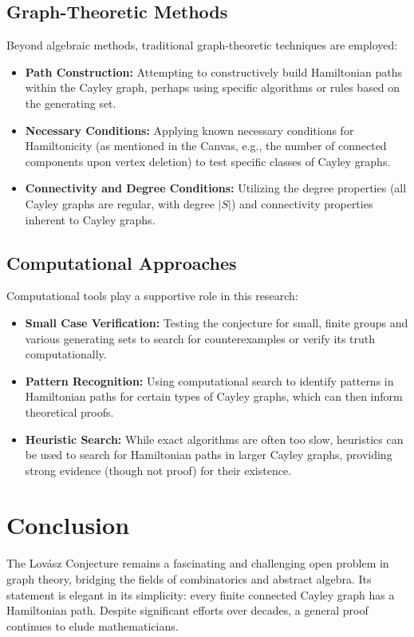 \documentclass[12pt]{article}
\theoremstyle{remark}
\begin{document}
\subsection{Graph-Theoretic Methods}
Beyond algebraic methods, traditional graph-theoretic techniques are employed:
\begin{itemize}
    \item \textbf{Path Construction:} Attempting to constructively build Hamiltonian paths within the Cayley graph, perhaps using specific algorithms or rules based on the generating set.
    \item \textbf{Necessary Conditions:} Applying known necessary conditions for Hamiltonicity (as mentioned in the Canvas, e.g., the number of connected components upon vertex deletion) to test specific classes of Cayley graphs.
    \item \textbf{Connectivity and Degree Conditions:} Utilizing the degree properties (all Cayley graphs are regular, with degree $|S|$) and connectivity properties inherent to Cayley graphs.
\end{itemize}

\subsection{Computational Approaches}
Computational tools play a supportive role in this research:
\begin{itemize}
    \item \textbf{Small Case Verification:} Testing the conjecture for small, finite groups and various generating sets to search for counterexamples or verify its truth computationally.
    \item \textbf{Pattern Recognition:} Using computational search to identify patterns in Hamiltonian paths for certain types of Cayley graphs, which can then inform theoretical proofs.
    \item \textbf{Heuristic Search:} While exact algorithms are often too slow, heuristics can be used to search for Hamiltonian paths in larger Cayley graphs, providing strong evidence (though not proof) for their existence.
\end{itemize}

\section{Conclusion}
The Lovász Conjecture remains a fascinating and challenging open problem in graph theory, bridging the fields of combinatorics and abstract algebra. Its statement is elegant in its simplicity: every finite connected Cayley graph has a Hamiltonian path. Despite significant efforts over decades, a general proof continues to elude mathematicians.
\end{document}
